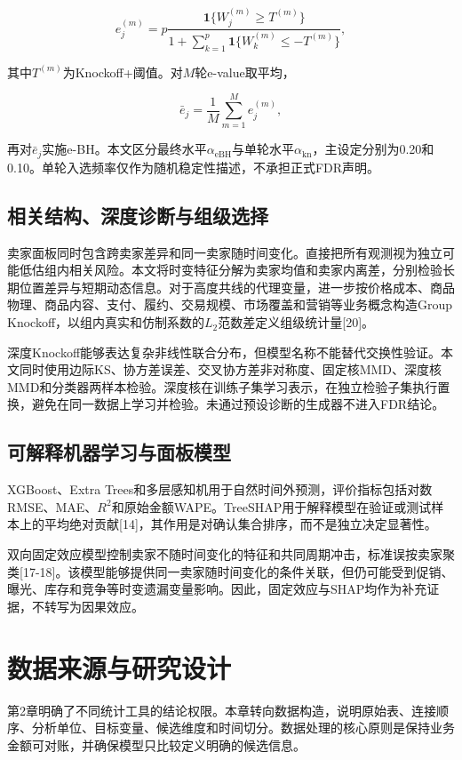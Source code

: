 \documentclass{sufethesismas}
\begin{document}
\[
e_j^{(m)}
=p\frac{\mathbf{1}\{W_j^{(m)}\ge T^{(m)}\}}
{1+\sum_{k=1}^{p}\mathbf{1}\{W_k^{(m)}\le -T^{(m)}\}},
\]

其中\(T^{(m)}\)为Knockoff+阈值。对\(M\)轮e-value取平均，

\[
\bar e_j=\frac{1}{M}\sum_{m=1}^{M}e_j^{(m)},
\]

再对\(\bar e_j\)实施e-BH。本文区分最终水平\(\alpha_{\mathrm{eBH}}\)与单轮水平\(\alpha_{\mathrm{kn}}\)，主设定分别为0.20和0.10。单轮入选频率仅作为随机稳定性描述，不承担正式FDR声明。

\section{相关结构、深度诊断与组级选择}

卖家面板同时包含跨卖家差异和同一卖家随时间变化。直接把所有观测视为独立可能低估组内相关风险。本文将时变特征分解为卖家均值和卖家内离差，分别检验长期位置差异与短期动态信息。对于高度共线的代理变量，进一步按价格成本、商品物理、商品内容、支付、履约、交易规模、市场覆盖和营销等业务概念构造Group Knockoff，以组内真实和仿制系数的\(L_2\)范数差定义组级统计量{[}20{]}。

深度Knockoff能够表达复杂非线性联合分布，但模型名称不能替代交换性验证。本文同时使用边际KS、协方差误差、交叉协方差非对称度、固定核MMD、深度核MMD和分类器两样本检验。深度核在训练子集学习表示，在独立检验子集执行置换，避免在同一数据上学习并检验。未通过预设诊断的生成器不进入FDR结论。

\section{可解释机器学习与面板模型}

XGBoost、Extra Trees和多层感知机用于自然时间外预测，评价指标包括对数RMSE、MAE、\(R^2\)和原始金额WAPE。TreeSHAP用于解释模型在验证或测试样本上的平均绝对贡献{[}14{]}，其作用是对确认集合排序，而不是独立决定显著性。

双向固定效应模型控制卖家不随时间变化的特征和共同周期冲击，标准误按卖家聚类{[}17-18{]}。该模型能够提供同一卖家随时间变化的条件关联，但仍可能受到促销、曝光、库存和竞争等时变遗漏变量影响。因此，固定效应与SHAP均作为补充证据，不转写为因果效应。

\chapter{数据来源与研究设计}

第2章明确了不同统计工具的结论权限。本章转向数据构造，说明原始表、连接顺序、分析单位、目标变量、候选维度和时间切分。数据处理的核心原则是保持业务金额可对账，并确保模型只比较定义明确的候选信息。
\end{document}
